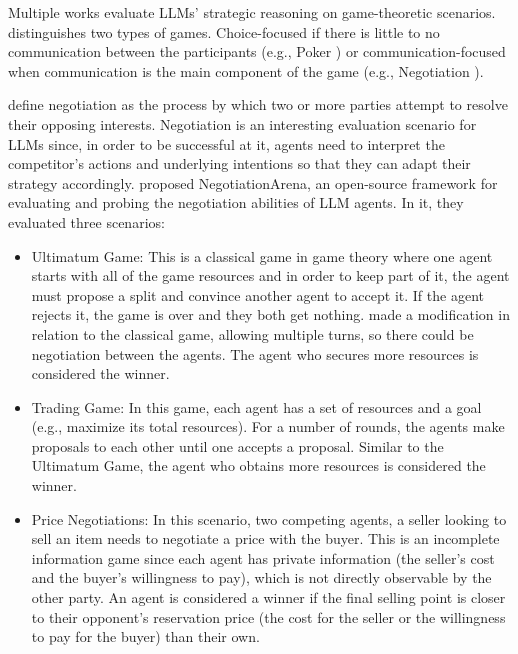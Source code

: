Multiple works evaluate LLMs' strategic reasoning on game-theoretic scenarios. \textcite{feng2025surveylargelanguagemodelbased} distinguishes two types of games. Choice-focused if there is little to no communication between the participants (e.g., Poker \cite{yim2024evaluatingenhancingllmsagent}) or communication-focused when communication is the main component of the game (e.g., Negotiation \cite{bianchi_how_2024}).

\textcite{zhan-etal-2024-lets} define negotiation as the process by which two or more parties attempt to resolve their opposing interests. Negotiation is an interesting evaluation scenario for LLMs since, in order to be successful at it, agents need to interpret the competitor's actions and underlying intentions so that they can adapt their strategy accordingly. \textcite{bianchi_how_2024} proposed NegotiationArena, an open-source framework for evaluating and probing the negotiation abilities of LLM agents. In it, they evaluated three scenarios:

\begin{itemize}
    \item Ultimatum Game: This is a classical game in game theory where one agent starts with all of the game resources and in order to keep part of it, the agent must propose a split and convince another agent to accept it. If the agent rejects it, the game is over and they both get nothing. \textcite{bianchi_how_2024} made a modification in relation to the classical game, allowing multiple turns, so there could be negotiation between the agents. The agent who secures more resources is considered the winner.
    \item Trading Game: In this game, each agent has a set of resources and a goal (e.g., maximize its total resources). For a number of rounds, the agents make proposals to each other until one accepts a proposal. Similar to the Ultimatum Game, the agent who obtains more resources is considered the winner.
    \item Price Negotiations: In this scenario, two competing agents, a seller looking to sell an item needs to negotiate a price with the buyer. This is an incomplete information game since each agent has private information (the seller’s cost and the buyer’s willingness to pay), which is not directly observable by the other party. An agent is considered a winner if the final selling point is closer to their opponent's reservation price (the cost for the seller or the willingness to pay for the buyer) than their own.
\end{itemize}

